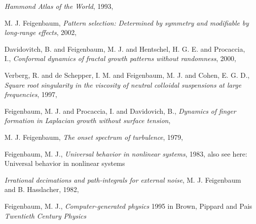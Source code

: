 {\em Hammond Atlas of the World},
{1993},

{M. J. Feigenbaum},
{\em Pattern selection: {Determined} by symmetry and modifiable by long-range effects},
{2002},

{Davidovitch, B. and Feigenbaum, M. J. and Hentschel, H. G. E. and Procaccia, I.},
  {\em Conformal dynamics of fractal growth patterns without randomness},
{2000},

{Verberg, R. and de Schepper, I. M. and Feigenbaum, M. J. and Cohen, E. G. D.},
  {\em Square root singularity in the viscosity of neutral colloidal suspensions at large frequencies},
{1997},

{Feigenbaum, M. J. and Procaccia, I. and Davidovich, B.},
  {\em Dynamics of finger formation in {Laplacian} growth without surface tension},

{M. J. Feigenbaum},
{\em The onset spectrum of turbulence},
{1979},

{Feigenbaum, M. J.},
{\em Universal behavior in nonlinear systems},
{1983},
also see here:
{Universal behavior in nonlinear systems}

{\em Irrational decimations and path-integrals for external noise},
{M. J. Feigenbaum and B. Hasslacher},
{1982},

{Feigenbaum, M. J.},
{\em Computer-generated physics}
1995 in {Brown, Pippard  and Pais}
{\em {Twentieth Century Physics}}

